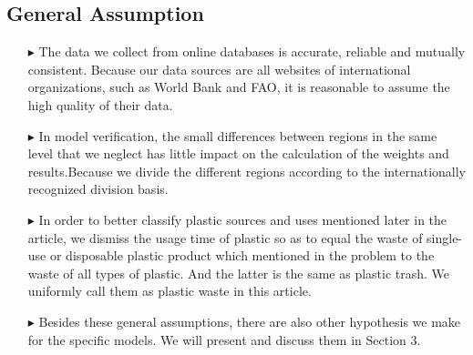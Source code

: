 \documentclass{mcmthesis}
\begin{document}
	 \subsection{General Assumption}
	 \begin{itemize}     
		\item[$\blacktriangleright$]The data we collect from online databases is accurate, reliable and mutually consistent. Because our data sources are all websites of international organizations, such as World Bank and FAO, it is reasonable to assume the high quality of their data.\\
		\item[$\blacktriangleright$] In model verification, the small differences between regions in the same level that we neglect has little impact on the calculation of the weights and results.Because we divide the different regions according to the internationally recognized division basis. \\
		\item[$\blacktriangleright$] In order to better classify plastic sources and uses mentioned later in the article, we dismiss the usage time of plastic so as to equal the waste of single-use or disposable plastic product which mentioned in the problem to the waste of all types of plastic. And the latter is the same as plastic trash. We uniformly call them as plastic waste in this article.\\
		\item[$\blacktriangleright$]Besides these general assumptions, there are also other hypothesis we make for the specific models. We will present and discuss them in Section 3.\\
		\end{itemize}
\end{document}
